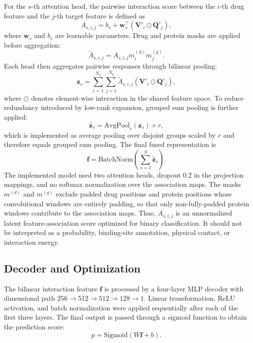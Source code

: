 \documentclass[computers,article,submit,moreauthors]{Definitions/mdpi}
\begin{document}
For the $s$-th attention head, the pairwise interaction score between the $i$-th drug feature and the $j$-th target feature is defined as
\begin{equation}
A_{s,i,j} = b_s + \mathbf{w}_s^\top \left(\mathbf{V}'_i \odot \mathbf{Q}'_j\right),
\end{equation}
where $\mathbf{w}_s$ and $b_s$ are learnable parameters. Drug and protein masks are applied before aggregation:
\begin{equation}
\widetilde{A}_{s,i,j} = A_{s,i,j} m_i^{(d)} m_j^{(q)}.
\end{equation}
Each head then aggregates pairwise responses through bilinear pooling:
\begin{equation}
\mathbf{z}_s = \sum_{i=1}^{N_v}\sum_{j=1}^{N_q} \widetilde{A}_{s,i,j}\left(\mathbf{V}'_i \odot \mathbf{Q}'_j\right),
\end{equation}
where $\odot$ denotes element-wise interaction in the shared feature space. To reduce redundancy introduced by low-rank expansion, grouped sum pooling is further applied:
\begin{equation}
\hat{\mathbf{z}}_s = \mathrm{AvgPool}_{r}(\mathbf{z}_s)\times r,
\end{equation}
which is implemented as average pooling over disjoint groups scaled by $r$ and therefore equals grouped sum pooling.
The final fused representation is
\begin{equation}
\mathbf{f} = \mathrm{BatchNorm}\left(\sum_{s=1}^{S}\hat{\mathbf{z}}_s\right).
\end{equation}
The implemented model used two attention heads, dropout 0.2 in the projection mappings, and no softmax normalization over the association maps. The masks $m^{(d)}$ and $m^{(q)}$ exclude padded drug positions and protein positions whose convolutional windows are entirely padding, so that only non-fully-padded protein windows contribute to the association maps. Thus, $A_{s,i,j}$ is an unnormalized latent feature-association score optimized for binary classification. It should not be interpreted as a probability, binding-site annotation, physical contact, or interaction energy.

\subsection{Decoder and Optimization}
The bilinear interaction feature $\mathbf{f}$ is processed by a four-layer MLP decoder with dimensional path $256 \rightarrow 512 \rightarrow 512 \rightarrow 128 \rightarrow 1$. Linear transformation, ReLU activation, and batch normalization were applied sequentially after each of the first three layers. The final output is passed through a sigmoid function to obtain the prediction score:
\begin{equation}
p = \mathrm{Sigmoid}(W\mathbf{f} + b).
\end{equation}
\end{document}
